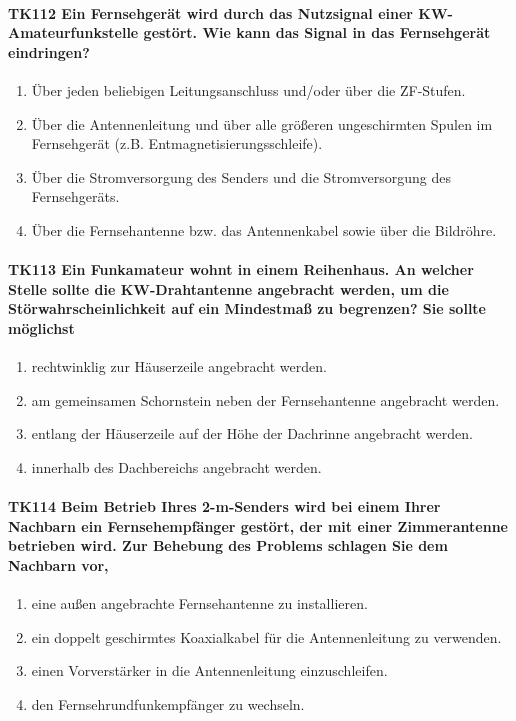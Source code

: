 \documentclass[8pt]{article}
\begin{document}
\paragraph*{TK112 Ein Fernsehgerät wird durch das Nutzsignal einer KW-Amateurfunkstelle gestört. Wie kann das Signal in das Fernsehgerät eindringen?}
\begin{enumerate}[nolistsep,label=\Alph*]
\item Über jeden beliebigen Leitungsanschluss und/oder über die ZF-Stufen.
\item Über die Antennenleitung und über alle größeren ungeschirmten Spulen im Fernsehgerät (z.B. Entmagnetisierungsschleife).
\item Über die Stromversorgung des Senders und die Stromversorgung des Fernsehgeräts.
\item Über die Fernsehantenne bzw. das Antennenkabel sowie über die Bildröhre.
\end{enumerate}

\paragraph*{TK113 Ein Funkamateur wohnt in einem Reihenhaus. An welcher Stelle sollte die KW-Drahtantenne angebracht werden, um die Störwahrscheinlichkeit auf ein Mindestmaß zu begrenzen? Sie sollte möglichst}
\begin{enumerate}[nolistsep,label=\Alph*]
\item rechtwinklig zur Häuserzeile angebracht werden.
\item am gemeinsamen Schornstein neben der Fernsehantenne angebracht werden.
\item entlang der Häuserzeile auf der Höhe der Dachrinne angebracht werden.
\item innerhalb des Dachbereichs angebracht werden.
\end{enumerate}

\paragraph*{TK114 Beim Betrieb Ihres 2-m-Senders wird bei einem Ihrer Nachbarn ein Fernsehempfänger gestört, der mit einer Zimmerantenne betrieben wird. Zur Behebung des Problems schlagen Sie dem Nachbarn vor,}
\begin{enumerate}[nolistsep,label=\Alph*]
\item eine außen angebrachte Fernsehantenne zu installieren.
\item ein doppelt geschirmtes Koaxialkabel für die Antennenleitung zu verwenden.
\item einen Vorverstärker in die Antennenleitung einzuschleifen.
\item den Fernsehrundfunkempfänger zu wechseln.
\end{enumerate}
\end{document}
